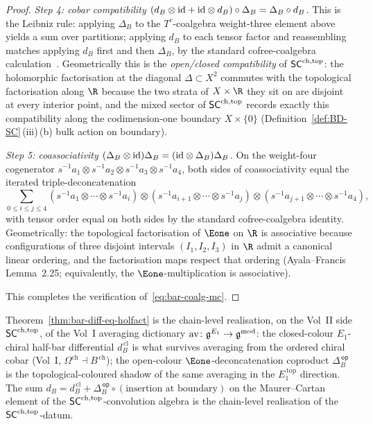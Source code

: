 \begin{proof}
\emph{Step 4: cobar compatibility $(d_B\otimes\mathrm{id}+\mathrm{id}\otimes d_B)\circ
\Delta_B=\Delta_B\circ d_B$.}
This is the Leibniz rule: applying $\Delta_B$ to the $T^c$-coalgebra
weight-three element above yields a sum over partitions; applying
$d_B$ to each tensor factor and reassembling matches applying
$d_B$ first and then $\Delta_B$, by the standard cofree-coalgebra
calculation~\cite[\S2.2.2]{LV12}. Geometrically this is the
\emph{open/closed compatibility} of $\mathsf{SC}^{\mathrm{ch},\mathrm{top}}$: the holomorphic
factorisation at the diagonal $\Delta\subset X^2$ commutes with the
topological factorisation along $\R$ because the two strata of
$X\times\R$ they sit on are disjoint at every interior point, and
the mixed sector of $\mathsf{SC}^{\mathrm{ch},\mathrm{top}}$ records exactly this compatibility
along the codimension-one boundary $X\times\{0\}$
(Definition~\ref{def:BD-SC}\,(iii)\,(b) bulk action on boundary).

\emph{Step 5: coassociativity $(\Delta_B\otimes\mathrm{id})\Delta_B=
(\mathrm{id}\otimes\Delta_B)\Delta_B$.}
On the weight-four cogenerator $s^{-1}a_1\otimes s^{-1}a_2\otimes
s^{-1}a_3\otimes s^{-1}a_4$, both sides of coassociativity equal
the iterated triple-deconcatenation
\[
 \sum_{0\leq i\leq j\leq 4}
 (s^{-1}a_1\otimes\cdots\otimes s^{-1}a_i)\otimes
 (s^{-1}a_{i+1}\otimes\cdots\otimes s^{-1}a_j)\otimes
 (s^{-1}a_{j+1}\otimes\cdots\otimes s^{-1}a_4),
\]
with tensor order equal on both sides by the standard cofree-coalgebra
identity. Geometrically: the topological factorisation of $\Eone$ on
$\R$ is associative because configurations of three disjoint
intervals $(I_1,I_2,I_3)$ in $\R$ admit a canonical linear
ordering, and the factorisation maps respect that
ordering (Ayala--Francis~\cite{AF15}\,Lemma~2.25; equivalently, the
$\Eone$-multiplication is associative).

This completes the verification of~\eqref{eq:bar-coalg-mc}.
\end{proof}

\begin{remark}\label{rem:bar-diff-vol1-avg}
Theorem~\ref{thm:bar-diff-eq-holfact} is the chain-level realisation,
on the Vol~II side $\mathsf{SC}^{\mathrm{ch},\mathrm{top}}$, of the Vol~I averaging
dictionary $\mathrm{av}\colon\mathfrak{g}^{E_1}\to\mathfrak{g}^{\mathrm{mod}}$:
the closed-colour $E_1$-chiral half-bar differential
$d_B^{\,\mathrm{cl}}$ is what survives averaging from the ordered
chiral cobar (Vol~I, $\Omega^{\mathrm{ch}}\dashv B^{\,\mathrm{ch}}$);
the open-colour $\Eone$-deconcatenation coproduct $\Delta_B^{\,\mathsf{op}}$
is the topological-coloured shadow of the same averaging in the
$E_1^{\,\mathrm{top}}$ direction. The sum
$d_B = d_B^{\,\mathrm{cl}} + \Delta_B^{\,\mathsf{op}}\circ
(\text{insertion at boundary})$ on the Maurer--Cartan element of the
$\mathsf{SC}^{\mathrm{ch},\mathrm{top}}$-convolution algebra is the chain-level realisation of
the $\mathsf{SC}^{\mathrm{ch},\mathrm{top}}$-datum.
\end{remark}

